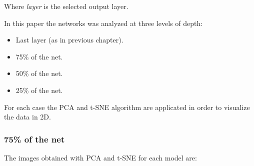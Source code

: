 \documentclass[12pt]{article} %
\begin{document}
Where\textit{ layer} is the selected output layer. 

In this paper the networks was analyzed at three levels of depth:
\begin{itemize}
\item Last layer (as in previous chapter).
\item 75\%  of the net.
\item 50\%  of the net.
\item 25\%  of the net.
\end{itemize}

For each case the PCA and t-SNE algorithm are applicated in order to visualize the data in 2D.\\

\subsubsection {75\%  of the net}
The images obtained with PCA and t-SNE for each model are:\\
\end{document}
